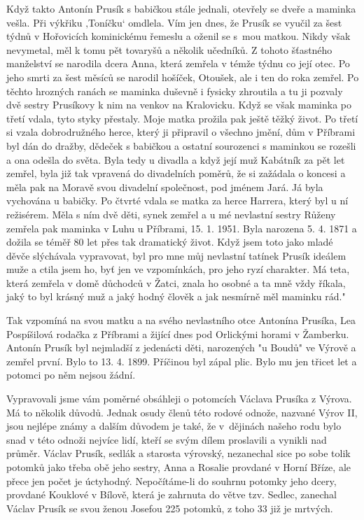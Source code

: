 \documentclass[../dejiny-rodu-prusiku.tex]{subfiles}
\begin{document}
Když takto Antonín Prusík s babičkou stále jednali, otevřely se dveře a maminka vešla. Při výkřiku ‚Toníčku‘ omdlela. Vím jen dnes, že Prusík se vyučil za šest týd­nů v Hořovicích kominickému řemeslu a oženil se s mou matkou. Nikdy však nevymetal, měl k tomu pět tovaryšů a několik učedníků. Z tohoto šťastného manželství se narodila dcera Anna, která zemřela v témže týdnu co její otec. Po jeho smrti za šest měsíců se narodil hošíček, Otoušek,  ale i ten do roka zemřel. Po těch­to hrozných ranách se maminka duševně i fysicky zhrou­tila a tu ji pozvaly dvě sestry Prusíkovy k nim na venkov na Kralovicku. Když se však maminka po třetí vdala, tyto styky přestaly. Moje matka prožila pak ještě těžký život. Po třetí si vzala dobrodružného herce, který ji připravil o všechno jmění, dům v Příbrami byl dán do dražby, dědeček s babičkou a ostatní sourozenci s maminkou se rozešli a ona odešla do světa. Byla tedy u divadla a když její muž Kabátník za pět let zemřel, byla již tak vpravená do divadelních poměrů, že si zažádala o koncesi a měla pak na Moravě svou divadelní společnost, pod jménem Jará. Já byla vychována u babič­ky. Po čtvrté vdala se matka za herce Harrera, který byl u ní režisérem. Měla s ním dvě děti, synek zemřel a u mé nevlastní sestry Růženy zemřela pak maminka v Luhu u Příbrami, 15. 1. 1951. Byla narozena 5. 4. 1871 a dožila se téměř 80 let přes tak dramatický život. Když jsem toto jako mladé děvče slýchávala vypravovat, byl pro mne můj nevlastní tatínek Prusík ideálem muže a ctila jsem ho, byť jen ve vzpomínkách, pro jeho ryzí charakter. Má teta, která zemřela v domě důchodců v Žatci, znala ho osobné a ta mně vždy říkala, jaký to byl krásný muž a jaký hodný člověk a jak nesmírně měl maminku rád."

Tak vzpomíná na svou matku a na svého nevlastního otce Antonína Prusíka, Lea Pospíšilová rodačka z Příbrami a žijící dnes pod Orlickými horami v Žamberku. Antonín Prusík byl nejmladší z jedenácti děti, narozených "u Boudů" ve Výrově a zemřel první. Bylo to 13. 4. 1899. Příčinou byl zápal plic. Bylo mu jen třicet let a potom­ci po něm nejsou žádní.

Vypravovali jsme vám poměrné obsáhleji o potomcích Václava Prusíka z Výrova. Má to několik důvodů. Jednak osudy členů této rodové odnože, nazvané Výrov II, jsou nejlépe známy a dalším důvodem je také, že v dějinách našeho rodu bylo snad v této odnoži nejvíce lidí, kteří se svým dílem proslavili a vynikli nad průměr. Václav Prusík, sedlák a starosta výrovský, nezanechal sice po sobe tolik potomků jako třeba obě jeho sestry, Anna a Rosalie provdané v Horní Bříze, ale přece jen počet je úctyhodný. Nepočítáme-li do souhrnu potomky jeho dcery, provdané Kouklové v Bílově, která je zahr­nuta do větve tzv. Sedlec, zanechal Václav Prusík se svou ženou Josefou 225 potomků, z toho 33 již je mrtvých.
\end{document}
